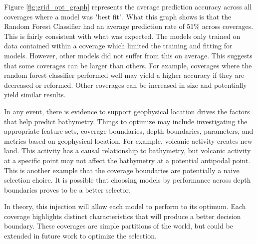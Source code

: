 \par
Figure \ref{fig:grid_opt_graph} represents the average prediction accuracy across all coverages where a model was "best fit".
What this graph shows is that the Random Forest Classifier had an average prediction rate of 51\% across coverages.
This is fairly consistent with what was expected. 
The models only trained on data contained within a coverage which limited the training and fitting for models. 
However, other models did not suffer from this on average.
This suggests that some coverages can be larger than others.
For example, coverages where the random forest classifier performed well may yield a higher accuracy if they are decreased or reformed.
Other coverages can be increased in size and potentially yield similar results.


\par
In any event, there is evidence to support geophysical location drives the factors that help predict bathymetry.
Things to optimize may include investigating the appropriate feature sets, coverage boundaries, depth boundaries, parameters, and metrics based on geophysical location.
For example, volcanic activity creates new land.
This activity has a causal relationship to bathymetry, but volcanic activity at a specific point may not affect the bathymetry at a potential antipodal point.
This is another example that the coverage boundaries are potentially a naive selection choice.
It is possible that choosing models by performance across depth boundaries proves to be a better selector.
\par
In theory, this injection will allow each model to perform to its optimum.
Each coverage highlights distinct characteristics that will produce a better decision boundary.
These coverages are simple partitions of the world, but could be extended in future work to optimize the selection.



